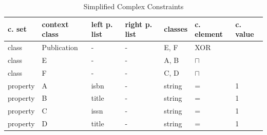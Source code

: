 \documentclass[a4paper,fontsize=11pt]{scrartcl}
\begin{document}

\begin{table}[H]
  \scriptsize
  \sffamily
  \vspace{0cm}
	\caption{Simplified Complex Constraints}
	\label{tab:simplified-complex-constraints}
	\centering
		\begin{tabular}{l|l|l|l|l|l|l}
      \textbf{c. set} & \textbf{context class} & \textbf{left p. list} & \textbf{right p. list} & \textbf{classes} & \textbf{c. element} & \textbf{c. value} \\
      \hline
class & Publication & - & - & E, F & XOR \\
class & E & - & - & A, B & $\sqcap$ \\
class & F & - & - & C, D & $\sqcap$ \\
property & A & isbn & - & string & = & 1 \\
property & B & title & - & string & = & 1 \\
property & C & issn & - & string & = & 1 \\
property & D & title & - & string & = & 1 \\
		\end{tabular}
\end{table}
\end{document}
